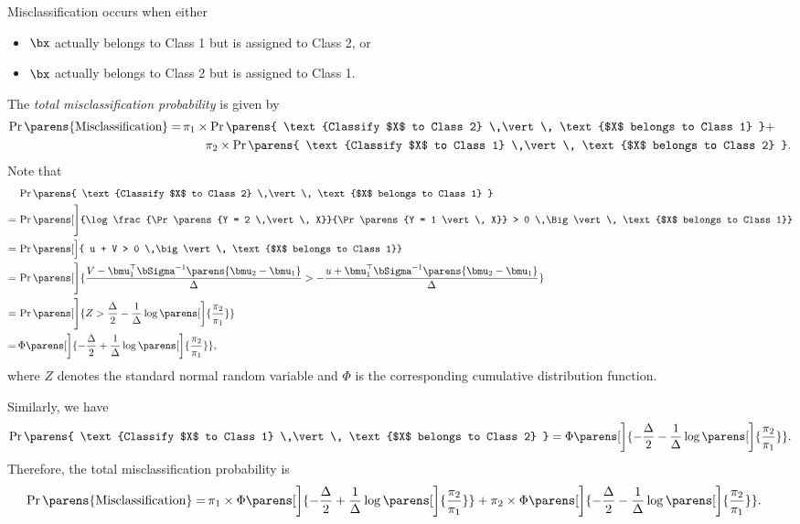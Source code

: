 \documentclass[12pt]{article}
\begin{document}
\begin{enumerate}[label=\textbf{\arabic*.}]
	Misclassification occurs when either 
	\begin{itemize}
		\item $\bx$ actually belongs to Class 1 but is assigned to Class 2, or 
		\item $\bx$ actually belongs to Class 2 but is assigned to Class 1. 
	\end{itemize}
	The \textit{total misclassification probability} is given by 
	\begin{align*}
		\Pr \parens{\text{Misclassification}} = & \, \pi_1 \times \Pr \parens{ \text{Classify $X$ to Class 2} \,\vert\, \text{$X$ belongs to Class 1} } + \\ 
		& \qquad \pi_2 \times \Pr \parens{ \text{Classify $X$ to Class 1} \,\vert\, \text{$X$ belongs to Class 2} }. 
	\end{align*}
	Note that 
	\begin{align*}
		& \, \Pr \parens{ \text{Classify $X$ to Class 2} \,\vert\, \text{$X$ belongs to Class 1} } \\ 
		= & \, \Pr \parens[\Bigg]{\log \frac{\Pr \parens{Y = 2 \,\vert\, X}}{\Pr \parens{Y = 1 \vert\, X}} > 0 \,\Big\vert\, \text{$X$ belongs to Class 1}} \\ 
		= & \, \Pr \parens[\Big]{ u + V > 0 \,\big\vert\, \text{$X$ belongs to Class 1}}  \\ 
		= & \, \Pr \parens[\Bigg]{ \frac{V - \bmu_1^\top \bSigma^{-1} \parens{\bmu_2 - \bmu_1}}{\Delta} > - \frac{u + \bmu_1^\top \bSigma^{-1} \parens{\bmu_2 - \bmu_1}}{\Delta} } \\ 
		= & \, \Pr \parens[\Bigg]{ Z > \frac{\Delta}{2} - \frac{1}{\Delta} \log \parens[\bigg]{\frac{\pi_2}{\pi_1}} } \\ 
		= & \, \Phi \parens[\bigg]{- \frac{\Delta}{2} + \frac{1}{\Delta} \log \parens[\bigg]{\frac{\pi_2}{\pi_1}}}, 
	\end{align*}
	where $Z$ denotes the standard normal random variable and $\Phi$ is the corresponding cumulative distribution function. 
	
	Similarly, we have 
	\begin{align*}
		\Pr \parens{ \text{Classify $X$ to Class 1} \,\vert\, \text{$X$ belongs to Class 2} }
		= \Phi \parens[\bigg]{- \frac{\Delta}{2} - \frac{1}{\Delta} \log \parens[\bigg]{\frac{\pi_2}{\pi_1}}}. 
	\end{align*}
	Therefore, the total misclassification probability is 
	\begin{align*}
		\Pr \parens{\text{Misclassification}} = & \, \pi_1 \times \Phi \parens[\bigg]{- \frac{\Delta}{2} + \frac{1}{\Delta} \log \parens[\bigg]{\frac{\pi_2}{\pi_1}}} + \pi_2 \times \Phi \parens[\bigg]{- \frac{\Delta}{2} - \frac{1}{\Delta} \log \parens[\bigg]{\frac{\pi_2}{\pi_1}}}. 
	\end{align*}
	

\end{enumerate}
\end{document}
